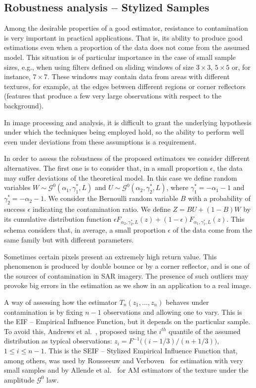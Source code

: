 \documentclass[twocolumn]{svjour3}
\begin{document}
\subsection{Robustness analysis -- Stylized Samples}
\label{robustez}
Among the desirable properties of a good estimator, resistance to contamination is very important in practical applications. 
That is, its ability to produce good estimations even when a proportion of the data does not come from the assumed model. 
This situation is of particular importance in the case of small sample sizes, e.g., when using filters defined on sliding windows of size $3 \times 3$, $5 \times 5$ or, for instance, $7 \times 7$. 
These windows may contain data from areas with different textures, for example, at the edges between different regions or corner reflectors (features that produce a few very large observations with respect to the background).

In image processing and analysis, it is difficult to grant the underlying hypothesis under which the techniques being employed hold, so the ability to perform well even under deviations from these assumptions is a requirement.

In order to assess the robustness of the proposed estimators we consider different alternatives. 
The first one is to consider that, in a small proportion $\epsilon$, the data may suffer deviations of the theoretical model. 
In this case we define random variables $W \sim \mathcal{G}^0(\alpha_1,\gamma_1^*,L)$ and $U \sim \mathcal{G}^0(\alpha_2,\gamma_2^*,L)$, where $\gamma_1^*=-\alpha_1-1$ and  $\gamma_2^*=-\alpha_2-1$. 
We consider the Bernoulli random variable $B$ with a probability of success $\epsilon$ indicating the contamination ratio.   
We define $Z=BU+(1-B)W$ by its cumulative distribution function   
$
\epsilon {F}_{\alpha_2,\gamma_2^*,L}(z)+(1-\epsilon) {F}_{\alpha_1,\gamma_1^*,L}(z)
$.
This schema considers that, in average, a small proportion $\epsilon$ of the data come from the same family but with different parameters. 

Sometimes certain pixels present an extremely high return value. 
This phenomenon is produced by double bounce or by a corner reflector, and is one of the sources of contamination in SAR imagery. 
The presence of such outliers may provoke big errors in the estimation as we show in an application to a real image. 

A way of assessing how the estimator $T_n(z_1,\dots,z_n)$ behaves under contamination is by fixing $n-1$ observations and allowing one to vary.
This is the EIF -- Empirical Influence Function, but it depends on the particular sample.
To avoid this, Andrews et al.~\cite{Andrews1972}, proposed using the $i^{th}$ quantile of the assumed distribution as typical observations: $z_i=F^{-1}\big((i-1/3)/(n+1/3) \big)$, $1\leq i\leq n-1$.
This is the SEIF -- Stylized Empirical Influence Function that, among others, was used by Rousseeuw and Verboven~\cite{RousseeuwCSDA} for estimation with very small samples and by Allende et al.~\cite{AllendeFreryetal:JSCS:05} for AM estimators of the texture under the amplitude $\mathcal G^0$ law.
\end{document}
